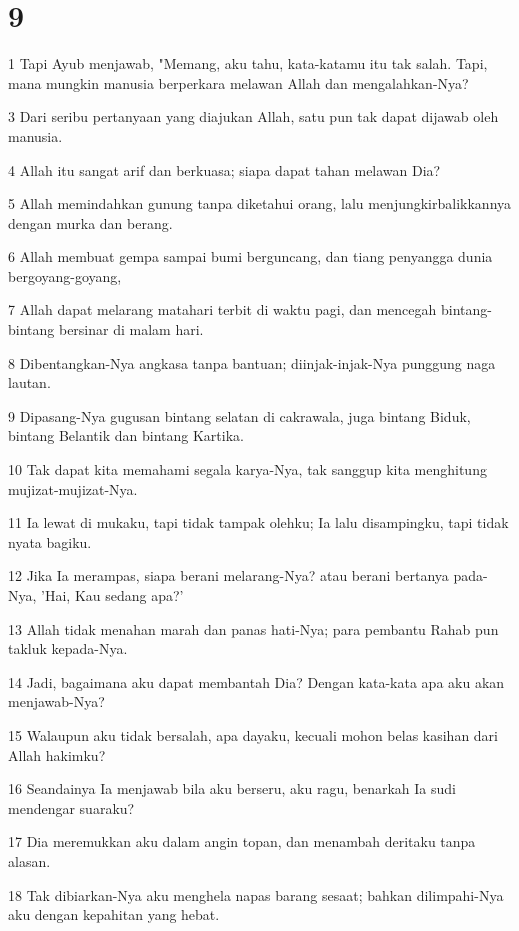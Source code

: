 \chapter{9}

\par 1 Tapi Ayub menjawab, "Memang, aku tahu, kata-katamu itu tak salah. Tapi, mana mungkin manusia berperkara melawan Allah dan mengalahkan-Nya?
\par 3 Dari seribu pertanyaan yang diajukan Allah, satu pun tak dapat dijawab oleh manusia.
\par 4 Allah itu sangat arif dan berkuasa; siapa dapat tahan melawan Dia?
\par 5 Allah memindahkan gunung tanpa diketahui orang, lalu menjungkirbalikkannya dengan murka dan berang.
\par 6 Allah membuat gempa sampai bumi berguncang, dan tiang penyangga dunia bergoyang-goyang,
\par 7 Allah dapat melarang matahari terbit di waktu pagi, dan mencegah bintang-bintang bersinar di malam hari.
\par 8 Dibentangkan-Nya angkasa tanpa bantuan; diinjak-injak-Nya punggung naga lautan.
\par 9 Dipasang-Nya gugusan bintang selatan di cakrawala, juga bintang Biduk, bintang Belantik dan bintang Kartika.
\par 10 Tak dapat kita memahami segala karya-Nya, tak sanggup kita menghitung mujizat-mujizat-Nya.
\par 11 Ia lewat di mukaku, tapi tidak tampak olehku; Ia lalu disampingku, tapi tidak nyata bagiku.
\par 12 Jika Ia merampas, siapa berani melarang-Nya? atau berani bertanya pada-Nya, 'Hai, Kau sedang apa?'
\par 13 Allah tidak menahan marah dan panas hati-Nya; para pembantu Rahab pun takluk kepada-Nya.
\par 14 Jadi, bagaimana aku dapat membantah Dia? Dengan kata-kata apa aku akan menjawab-Nya?
\par 15 Walaupun aku tidak bersalah, apa dayaku, kecuali mohon belas kasihan dari Allah hakimku?
\par 16 Seandainya Ia menjawab bila aku berseru, aku ragu, benarkah Ia sudi mendengar suaraku?
\par 17 Dia meremukkan aku dalam angin topan, dan menambah deritaku tanpa alasan.
\par 18 Tak dibiarkan-Nya aku menghela napas barang sesaat; bahkan dilimpahi-Nya aku dengan kepahitan yang hebat.
